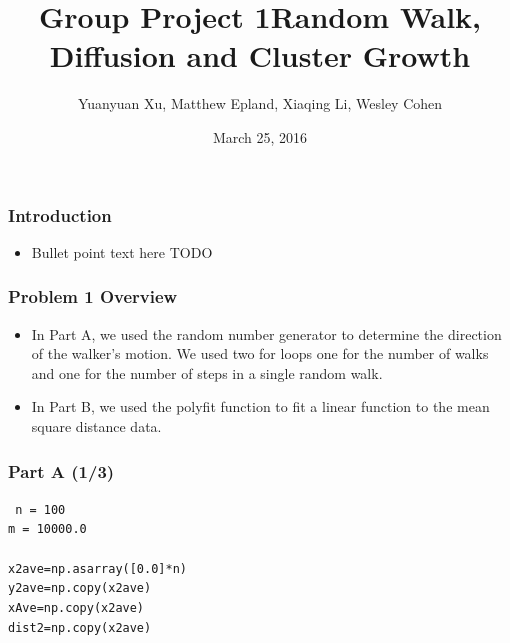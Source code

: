 \documentclass[mathserif,18pt,xcolor=table]{beamer}
\title[Group Project 1]{Group Project 1\newline Random Walk, Diffusion and Cluster Growth}
\author[Xu, Epland, Li, Cohen]{{\small Yuanyuan Xu, Matthew Epland, Xiaqing Li, Wesley Cohen}}
\institute{Duke University}
\date{March 25, 2016}
\begin{document}
\beamertemplateballitem
\frame{\titlepage}


\begin{frame}
  \frametitle{Introduction}
  \begin{itemize}
    \item Bullet point text here TODO
  \end{itemize}

\end{frame}

\begin{frame}
	\frametitle{Problem 1 Overview}
	\begin{itemize}
		\item In Part A, we used the random number generator to determine the direction of the walker's motion. We used two for loops one for the number of walks and one for the number of steps in a single random walk. 
		\item In Part B, we used the polyfit function to fit a linear function to the mean square distance data.
	\end{itemize}
\end{frame}

\begin{frame}
	\frametitle{Part A (1/3)}
	{
	\tt
	\qquad n = 100     \\                                 
	\qquad m = 10000.0   \\                             
	~\\
	\qquad x2ave=np.asarray([0.0]*n) \\                
	\qquad y2ave=np.copy(x2ave)      \\                 
	\qquad xAve=np.copy(x2ave)       \\                  
	\qquad dist2=np.copy(x2ave)                        
	}
\end{frame}
\end{document}
